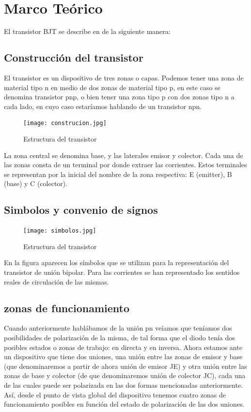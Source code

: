 \documentclass[10pt, a4paper]{article}
\begin{document}
    \newpage

    \section{Marco Teórico}

    El transistor BJT se describe en \cite{watson53} de la siguiente manera: 

    \subsection{Construcción del transistor}

    El transistor es un dispositivo de tres zonas o capas. Podemos tener una zona de material tipo n en medio de dos zonas de material tipo p, en este caso se denomina transistor pnp, o bien tener una zona tipo p con dos zonas tipo n a cada lado, en cuyo caso estaríamos hablando de un transistor npn.

    \begin{figure}[h!]
        \centering
        \texttt{[image: construcion.jpg]}
        \caption{\label{fig:1} Estructura del transistor }
    \end{figure}

    La zona central se denomina base, y las laterales emisor y colector. Cada una de las zonas consta de un terminal por donde extraer las corrientes. Estos terminales se representan por la inicial del nombre de la zona respectiva: E (emitter), B (base) y C (colector).

    \subsection{Simbolos y convenio de signos}

    \begin{figure}[h!]
        \centering
        \texttt{[image: simbolos.jpg]}
        \caption{\label{fig:2} Estructura del transistor }
    \end{figure}

    En la figura aparecen los símbolos que se utilizan para la representación del transistor de unión bipolar. Para las corrientes se han representado los sentidos reales de circulación de las mismas.

    \subsection{zonas de funcionamiento}

    Cuando anteriormente hablábamos de la unión pn veíamos que teníamos dos posibilidades de polarización de la misma, de tal forma que el diodo tenía dos posibles estados o zonas de trabajo: en directa y en inversa. Ahora estamos ante un dispositivo que tiene dos uniones, una unión entre las zonas de emisor y base (que denominaremos a partir de ahora unión de emisor JE) y otra unión entre las zonas de base y colector (de que denominaremos unión de colector JC), cada una de las cuales puede ser polarizada en las dos formas mencionadas anteriormente. Así, desde el punto de vista global del dispositivo tenemos cuatro zonas de funcionamiento posibles en función del estado de polarización de las dos uniones.
\end{document}
